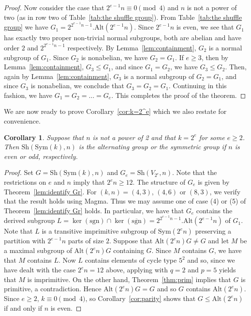 \documentclass[12pt]{amsart}
\newtheorem{cor}[thm]{Corollary}
\theoremstyle{remark}
\theoremstyle{definition}
\newcommand{\sym}{\mathrm{Sym}}
\newcommand{\alt}{\mathrm{Alt}}
\newcommand{\sh}{\mathrm{Sh}}
\begin{document}
\begin{proof}
Now consider the case that $2^{e-1}n \equiv 0 \pmod 4$ and $n$ is not a power of two (as in row two of Table~\ref{tab:the shuffle group}). From Table~\ref{tab:the shuffle group} we have  $G_1 = 2^{2^{e-1}n-1}.\alt(2^{e-1}n)$. Since $2^{e-1}n$ is even, we see that $G_1$ has exactly two proper non-trivial normal subgroups, both are abelian and have order $2$ and $2^{2^{e-1}n-1}$ respectively. By Lemma~\ref{lem:containment},  $G_2 $ is a normal subgroup of $G_1$. Since $G_2$ is nonabelian, we have $G_2=G_1$. If $e \geqslant 3$, then by Lemma~\ref{lem:containment}, $G_3\leqslant G_1$, and since $G_1=G_2$, we have $G_3 \leqslant G_2$.  Then, again by Lemma~\ref{lem:containment}, $G_3$ is a normal subgroup of $G_2=G_1$, and since $G_3$ is nonabelian, we conclude that $G_3=G_2=G_1$. Continuing in this fashion, we have $G_1=G_2=\dots=G_e$. This completes the proof of the theorem.
%
\end{proof}
 
 We are now ready to prove Corollary~\ref{cor:k=2^e} which we also restate for convenience.
 
\begin{cor} 
 Suppose that $n$ is not a power of 2 and that $k = 2^e$ for some $e\geqslant 2$. Then $\sh(\sym(k),n)$ is the  alternating group  or the symmetric group if $n$ is even or odd, respectively.
\end{cor}
\begin{proof}
Set $G=\sh(\sym(k),n)$ and $G_e=\sh(V_{2^e},n)$. Note that the restrictions on $e$ and $n$ imply that $2^en\geqslant 12$. The structure of $G_e$ is given by  Theorem~\ref{lem:identify Gr}. For $(k,n)=(4,3)$, $(4,6)$ or $(8,3)$, we verify that the result holds using {\sc Magma}. Thus we may assume one of case (4) or (5) of Theorem~\ref{lem:identify Gr} holds. In particular, we have that $G_e$ contains the derived subgroup  $L=\ker(\mathrm{sgn}) \cap \ker(\overline{\mathrm{sgn}})=2^{2^{e-1}n-1}.\alt(2^{e-1}n)$ of $G_1$. Note that $L$ is a transitive imprimitive subgroup of $\sym(2^en)$ preserving a partition with $2^{e-1}n$ parts of size $2$. 
Suppose that $\alt(2^en)G \neq G$   and let $M$ be a maximal subgroup of $\alt(2^en)G$ containing $G$. Since $M$ contains $G$, we have that $M$ contains $L$. Now  $L$ contains elements of cycle type $5^2$ and so, since we have dealt with the case $2^en = 12$ above, applying   \cite[Theorem 13.10]{wielandt} with $q=2$ and $p=5$ yields  that $M$  is imprimitive. On the other hand, Theorem~\ref{thm:prim} implies that $G$ is primitive, a contradiction. Hence $\alt(2^en)G = G$ and so  $G$ contains $\alt(2^en)$. Since $e \geqslant 2$, $k\equiv 0 \pmod{4}$, so Corollary~\ref{cor:parity} shows that $G \leqslant \alt(2^en)$ if and only if $n$ is even.
\end{proof}
\end{document}
